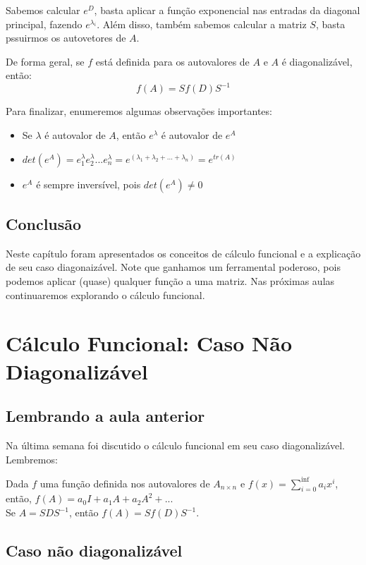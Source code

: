 \documentclass[12pt]{article}
\begin{document}
Sabemos calcular $e^D$, basta aplicar a função exponencial nas entradas da diagonal principal, fazendo $e^{\lambda_i}$. Além disso, também sabemos calcular a matriz $S$, basta pssuirmos os autovetores de $A$.

De forma geral, se $f$ está definida para os autovalores de $A$ e $A$ é diagonalizável, então:
\begin{equation*}
	f(A)=Sf(D)S^{-1}
\end{equation*}

Para finalizar, enumeremos algumas observações importantes:
\begin{itemize}
	\item Se $\lambda$ é autovalor de $A$, então $e^\lambda$ é autovalor de $e^A$
	\item $det(e^A)=e^\lambda_1e^\lambda_2...e^\lambda_n=e^(\lambda_1+\lambda_2+...+\lambda_n)=e^{tr(A)}$
	\item $e^A$ é sempre inversível, pois $det(e^A)\neq 0$
\end{itemize}

\subsection{Conclusão}
Neste capítulo foram apresentados os conceitos de cálculo funcional e a explicação de seu caso diagonaizável. Note que ganhamos um ferramental poderoso, pois podemos aplicar (quase) qualquer função a uma matriz. Nas próximas aulas continuaremos explorando o cálculo funcional. 

\section{Cálculo Funcional: Caso Não Diagonalizável}

\subsection{Lembrando a aula anterior}

Na última semana foi discutido o cálculo funcional em seu caso diagonalizável. Lembremos:

Dada $f$ uma função definida nos autovalores de $A_{n\times n}$	e $f(x)=\sum_{i=0}^{\inf}a_ix^i$, então, $f(A)=a_0I+a_1A+a_2A^2+...$\\

Se $A=SDS^{-1}$, então $f(A)=Sf(D)S^{-1}$.

\subsection{Caso não diagonalizável}
\end{document}
